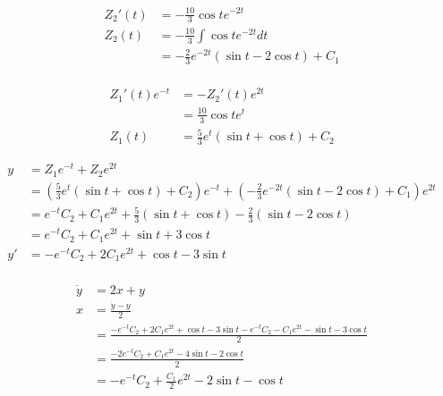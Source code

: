 \begin{align*}
    Z_2'(t) & = - \frac{10}{3}\cos t e^{ -2t}                  \\
    Z_2(t)  & = - \frac{10}{3}\int \cos t e^{ -2t} dt          \\
            & = - \frac{2}{3}e^{ - 2t}(\sin t - 2\cos t) + C_1 \\
\end{align*}

\begin{align*}
    Z_1'(t)e^{ - t} & = - Z_2'(t) e^{2t}                       \\
                    & = \frac{10}{3}\cos t e^t                 \\
    Z_1(t)          & = \frac{5}{3} e^t(\sin t + \cos t) + C_2
\end{align*}

\begin{align*}
    y  & = Z_1 e^{ - t} + Z_2 e^{2t}                                                                                                             \\
       & = \left( \frac{5}{3} e^t(\sin t + \cos t) + C_2 \right) e^{ - t} + \left( - \frac{2}{3}e^{ - 2t}(\sin t - 2\cos t) + C_1 \right) e^{2t} \\
       & = e^{ - t} C_2 + C_1 e^{2t} + \frac{5}{3} (\sin t + \cos t) - \frac{2}{3}(\sin t - 2\cos t)                                             \\
       & = e^{ - t} C_2 + C_1 e^{2t} + \sin t + 3\cos t                                                                                          \\
    y' & = -e^{ - t} C_2 + 2C_1 e^{2t} + \cos t - 3\sin t                                                                                        \\
\end{align*}

\begin{align*}
    \dot y & = 2x + y                                                                                                  \\
    x      & = \frac{\dot y - y}{2}                                                                                    \\
           & = \frac{-e^{ - t} C_2 + 2C_1 e^{2t} + \cos t - 3\sin t - e^{ - t} C_2 - C_1 e^{2t} - \sin t - 3\cos t}{2} \\
           & = \frac{- 2e^{ - t} C_2 + C_1 e^{2t} - 4\sin t - 2\cos t}{2}                                              \\
           & = -e^{ - t} C_2 + \frac{C_1}{2} e^{2t} - 2\sin t - \cos t                                                 \\
\end{align*}

